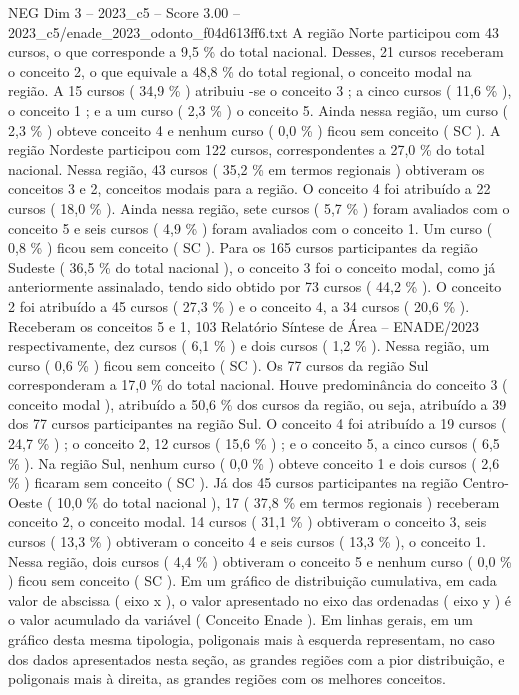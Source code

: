 \begin{textsample}{NEG Dim 3 – 2023\_c5 – Score 3.00 – 2023\_c5/enade\_2023\_odonto\_f04d613ff6.txt}
A região Norte participou com 43 cursos, o que corresponde a 9,5 \% do total nacional.
Desses, 21 cursos receberam o conceito 2, o que equivale a 48,8 \% do total regional, o conceito modal na região.
A 15 cursos ( 34,9 \% ) atribuiu -se o conceito 3 ; a cinco cursos ( 11,6 \% ), o conceito 1 ; e a um curso ( 2,3 \% ) o conceito 5.
Ainda nessa região, um curso ( 2,3 \% ) obteve conceito 4 e nenhum curso ( 0,0 \% ) ficou sem conceito ( SC ).
A região Nordeste participou com 122 cursos, correspondentes a 27,0 \% do total nacional.
Nessa região, 43 cursos ( 35,2 \% em termos regionais ) obtiveram os conceitos 3 e 2, conceitos modais para a região.
O conceito 4 foi atribuído a 22 cursos ( 18,0 \% ).
Ainda nessa região, sete cursos ( 5,7 \% ) foram avaliados com o conceito 5 e seis cursos ( 4,9 \% ) foram avaliados com o conceito 1.
Um curso ( 0,8 \% ) ficou sem conceito ( SC ).
Para os 165 cursos participantes da região Sudeste ( 36,5 \% do total nacional ), o conceito 3 foi o conceito modal, como já anteriormente assinalado, tendo sido obtido por 73 cursos ( 44,2 \% ).
O conceito 2 foi atribuído a 45 cursos ( 27,3 \% ) e o conceito 4, a 34 cursos ( 20,6 \% ).
Receberam os conceitos 5 e 1, 103 Relatório Síntese de Área – ENADE/2023 respectivamente, dez cursos ( 6,1 \% ) e dois cursos ( 1,2 \% ).
Nessa região, um curso ( 0,6 \% ) ficou sem conceito ( SC ).
Os 77 cursos da região Sul corresponderam a 17,0 \% do total nacional.
Houve predominância do conceito 3 ( conceito modal ), atribuído a 50,6 \% dos cursos da região, ou seja, atribuído a 39 dos 77 cursos participantes na região Sul.
O conceito 4 foi atribuído a 19 cursos ( 24,7 \% ) ; o conceito 2, 12 cursos ( 15,6 \% ) ; e o conceito 5, a cinco cursos ( 6,5 \% ).
Na região Sul, nenhum curso ( 0,0 \% ) obteve conceito 1 e dois cursos ( 2,6 \% ) ficaram sem conceito ( SC ).
Já dos 45 cursos participantes na região Centro-Oeste ( 10,0 \% do total nacional ), 17 ( 37,8 \% em termos regionais ) receberam conceito 2, o conceito modal. 14 cursos ( 31,1 \% ) obtiveram o conceito 3, seis cursos ( 13,3 \% ) obtiveram o conceito 4 e seis cursos ( 13,3 \% ), o conceito 1.
Nessa região, dois cursos ( 4,4 \% ) obtiveram o conceito 5 e nenhum curso ( 0,0 \% ) ficou sem conceito ( SC ).
Em um gráfico de distribuição cumulativa, em cada valor de abscissa ( eixo x ), o valor apresentado no eixo das ordenadas ( eixo y ) é o valor acumulado da variável ( Conceito Enade ).
Em linhas gerais, em um gráfico desta mesma tipologia, poligonais mais à esquerda representam, no caso dos dados apresentados nesta seção, as grandes regiões com a pior distribuição, e poligonais mais à direita, as grandes regiões com os melhores conceitos.

\end{textsample}
